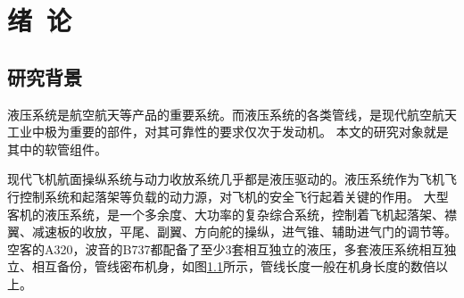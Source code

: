 


\chapter{绪~论}


\section{研究背景}

液压系统是航空航天等产品的重要系统。而液压系统的各类管线，是现代航空航天工业中极为重要的部件，对其可靠性的要求仅次于发动机。
本文的研究对象就是其中的软管组件。


现代飞机航面操纵系统与动力收放系统几乎都是液压驱动的。液压系统作为飞机飞行控制系统和起落架等负载的动力源，对飞机的安全飞行起着关键的作用。
大型客机的液压系统，是一个多余度、大功率的复杂综合系统，控制着飞机起落架、襟翼、减速板的收放，平尾、副翼、方向舵的操纵，进气锥、辅助进气门的调节等\cite{dingfei2010}。空客的A320，波音的B737都配备了至少3套相互独立的液压\cite{dingfei2010}，多套液压系统相互独立、相互备份，管线密布机身，如图\ref{fig:plane-hose}所示，管线长度一般在机身长度的数倍以上。




\begin{figure}[!htbp]
	\centering
	\hspace{1cm}
	\label{fig:plane-hose}
	
\end{figure}




